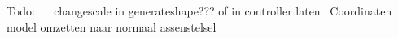 Todo\+:~\newline
~\newline
 changescale in generateshape??? of in controller laten~\newline
 Coordinaten model omzetten naar normaal assenstelsel 